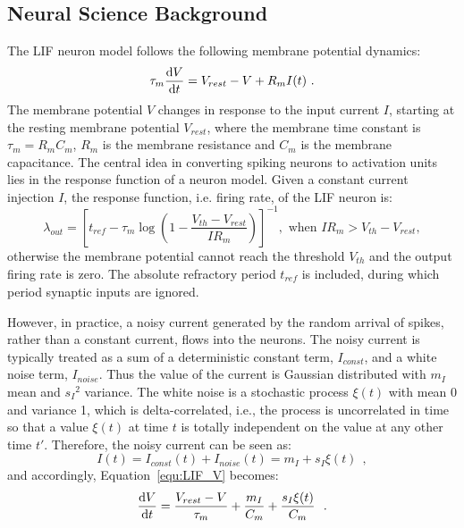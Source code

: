 \subsection{Neural Science Background}
	The LIF neuron model follows the following membrane potential dynamics:
	\begin{equation}
	\tau_m \frac{\mathrm{d} V}{\mathrm{d} t}=V_{rest} - V + R_{m} I(t) ~.
	\label{equ:LIF_V}
	\end{equation}
	The membrane potential $V$ changes in response to the input current $I$, starting at the resting membrane potential $V_{rest}$, where the membrane time constant is $\tau_m = R_mC_m$, $R_m$ is the membrane resistance and $C_m$ is the membrane capacitance.
	The central idea in converting spiking neurons to activation units lies in the response function of a neuron model.
	Given a constant current injection $I$, the response function, i.e. firing rate, of the LIF neuron is:
	\begin{equation}
	\lambda_\mathit{out}=
	\left [ t_\mathit{ref}-\tau_m\log \left ( 1-\frac{V_{th}-V_\mathit{rest}}{IR_m}  \right )\right ]^{-1}, \textrm{~when~} IR_m>V_{th}-V_{rest},
	\label{equ:consI}
	\end{equation}
	otherwise the membrane potential cannot reach the threshold $V_{th}$ and the output firing rate is zero. 
	The absolute refractory period $t_\mathit{ref}$ is included, during which period synaptic inputs are ignored.
	
	However, in practice, a noisy current generated by the random arrival of spikes, rather than a constant current, flows into the neurons.
	The noisy current is typically treated as a sum of a deterministic constant term, $I_{const}$, and a white noise term, $I_{noise}$.
	Thus the value of the current is Gaussian distributed with $m_I$ mean and ${s_I}^2$ variance.
	The white noise is a stochastic process $\xi(t)$ with mean 0 and variance 1, which is delta-correlated, i.e., the process is uncorrelated in time so that a value $\xi(t)$ at time $t$ is totally independent on the value at any other time $t'$.
	Therefore, the noisy current can be seen as:
	\begin{equation}
	I(t) = I_{const}(t)+I_{noise}(t) = m_I + s_I\xi(t)~~,
	\label{equ:noisyI}
	\end{equation}
	and accordingly, Equation~\ref{equ:LIF_V} becomes:
	\begin{equation}
	\frac{\mathrm{d} V}{\mathrm{d} t}=\frac{V_{rest} - V}{\tau_m } + \frac{m_I}{C_m} + \frac{s_I\xi(t)}{C_m}~~.
	\label{equ:LIF_V2}
	\end{equation}
	
